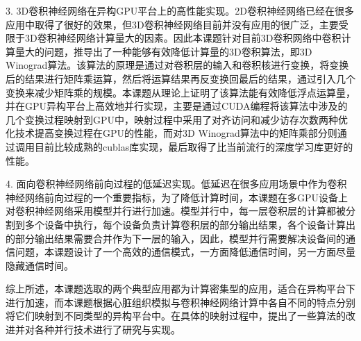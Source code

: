 \begin{cabstract}
\begin{compactitem}
\item[3.]3D卷积神经网络在异构GPU平台上的高性能实现。2D卷积神经网络已经在很多应用中取得了很好的效果，但3D卷积神经网络目前并没有应用的很广泛，主要受限于3D卷积神经网络计算量大的因素。因此本课题针对目前3D卷积网络中卷积计算量大的问题，推导出了一种能够有效降低计算量的3D卷积算法，即3D Winograd算法。该算法的原理是通过对卷积层的输入和卷积核进行变换，将变换后的结果进行矩阵乘运算，然后将运算结果再反变换回最后的结果，通过引入几个变换来减少矩阵乘的规模。本课题从理论上证明了该算法能有效降低浮点运算量，并在GPU异构平台上高效地并行实现，主要是通过CUDA编程将该算法中涉及的几个变换过程映射到GPU中，映射过程中采用了对齐访问和减少访存次数两种优化技术提高变换过程在GPU的性能，而对3D Winograd算法中的矩阵乘部分则通过调用目前比较成熟的cublas库实现，最后取得了比当前流行的深度学习库更好的性能。

\item[4.]面向卷积神经网络前向过程的低延迟实现。低延迟在很多应用场景中作为卷积神经网络前向过程的一个重要指标，为了降低计算时间，本课题在多GPU设备上对卷积神经网络采用模型并行进行加速。模型并行中，每一层卷积层的计算都被分割到多个设备中执行，每个设备负责计算卷积层的部分输出结果，各个设备计算出的部分输出结果需要合并作为下一层的输入，因此，模型并行需要解决设备间的通信问题，本课题设计了一个高效的通信模式，一方面降低通信时间，另一方面尽量隐藏通信时间。

\end{compactitem}

综上所述，本课题选取的两个典型应用都为计算密集型的应用，适合在异构平台下进行加速，而本课题根据心脏组织模拟与卷积神经网络计算中各自不同的特点分别将它们映射到不同类型的异构平台中。在具体的映射过程中，提出了一些算法的改进并对各种并行技术进行了研究与实现。

\end{cabstract}

